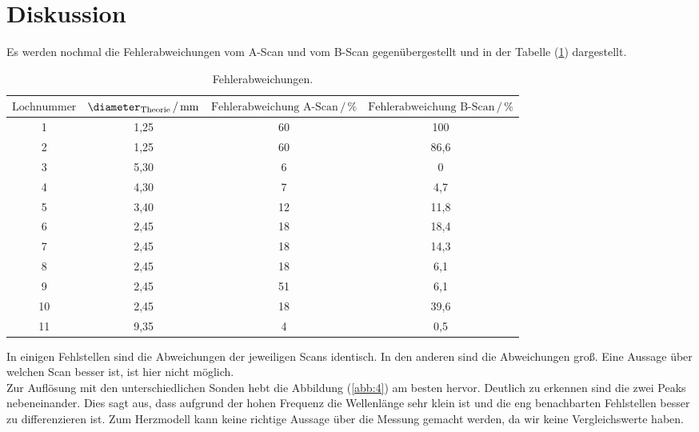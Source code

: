 \section{Diskussion}
Es werden nochmal die Fehlerabweichungen vom A-Scan und vom B-Scan
gegenübergestellt und in der Tabelle (\ref{tab:8}) dargestellt.
\begin{table}[H]
  \centering
  \caption{Fehlerabweichungen.}
  \label{tab:8}
  \begin{tabular}{c c c c}
    \toprule
    $\text{Lochnummer}$&
    $\diameter_{\text{Theorie}} \,/\, \si[per-mode=fraction]{\milli\meter}$&
    $\text{Fehlerabweichung A-Scan}  \,/\, \%$&
    $\text{Fehlerabweichung B-Scan} \,/\, \%$\\
    \midrule
    1   & 1,25 & 60  & 100  \\
    2   & 1,25 & 60  & 86,6 \\
    3   & 5,30 & 6   & 0    \\
    4   & 4,30 & 7   & 4,7  \\
    5   & 3,40 & 12  & 11,8 \\
    6   & 2,45 & 18  & 18,4 \\
    7   & 2,45 & 18  & 14,3 \\
    8   & 2,45 & 18  & 6,1  \\
    9   & 2,45 & 51  & 6,1  \\
    10  & 2,45 & 18  & 39,6 \\
    11  & 9,35 &  4  & 0,5  \\
  \bottomrule
  \end{tabular}
\end{table}
In einigen Fehlstellen sind die Abweichungen der jeweiligen Scans identisch. In den
anderen sind die Abweichungen groß. Eine Aussage über welchen Scan besser ist, ist
hier nicht möglich. \\
Zur Auflösung mit den unterschiedlichen Sonden hebt die Abbildung (\ref{abb:4}) am
besten hervor. Deutlich zu erkennen sind die zwei Peaks nebeneinander. Dies
sagt aus, dass aufgrund der hohen Frequenz die Wellenlänge sehr klein ist und
die eng benachbarten Fehlstellen besser zu differenzieren ist.
Zum Herzmodell kann keine richtige Aussage über
die Messung gemacht werden, da wir keine Vergleichswerte
haben.
